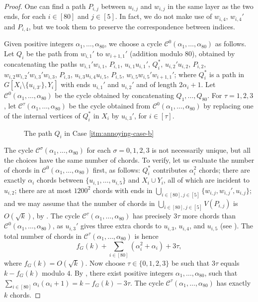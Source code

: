 \documentclass[10pt,a4paper]{amsart}
\theoremstyle{plain}
\theoremstyle{definition}
\newcommand{\C}{\mathcal{C}}
\begin{document}
\begin{proof}
        One can find a path $P_{i, j}$ between $u_{i, j}$ and $w_{i, j}$ in the same layer as the two ends, for each $i \in [80]$ and $j \in [5]$. 
        In fact, we do not make use of $w_{i, 4}$, $w_{i, 4}'$ and $P_{i, 4}$, but we took them to preserve the correspondence between indices.
        
        Given positive integers $\alpha_1, \ldots, \alpha_{80}$, we choose a cycle $\C^0(\alpha_1, \ldots, \alpha_{80})$ as follows. Let $Q_i$ be the path from $w_{i, 1}'$ to $w_{i+1, 1}'$ (addition modulo $80$), obtained by concatenating the paths $w_{i,1}' w_{i,1}$, $P_{i, 1}$, $u_{i, 1} u_{i, 1}'$, $Q_{i}^*$, $u_{i, 2}' u_{i, 2}$, $P_{i, 2}$, $w_{i, 2} w_{i, 2}' w_{i, 3}' w_{i, 3}$, $P_{i, 3}$, $u_{i, 3} u_{i, 4} u_{i, 5}$, $P_{i, 5}$, $w_{i, 5} w_{i, 5}' w_{i+1, 1}'$; where $Q_i^*$ is a path in $G[X_i \setminus \{u_{i, 3'}\}, Y_i]$ with ends $u_{i,1}'$ and $u_{i, 2}'$ and of length $2\alpha_i + 1$. Let $\C^0(\alpha_1, \ldots, \alpha_{80})$ be the cycle obtained by concatenating $Q_1, \ldots, Q_{80}$. For $\tau =1,2,3$, let $\C^{\tau}(\alpha_1, \ldots, \alpha_{80})$ be the cycle obtained from $\C^0(\alpha_1, \ldots, \alpha_{80})$ by replacing one of the internal vertices of $Q_{i}^*$ in $X_i$ by $u_{i, 3}'$, for $i \in [\tau]$. 
        \begin{figure}
            \centering

            \caption{The path $Q_i$ in Case \ref{itm:annoying-case-b}}
            \label{fig:annoying-case-b}
        \end{figure}
        
        The cycle $\C^\sigma(\alpha_1, \ldots, \alpha_{80})$ for each $\sigma=0,1,2,3$ is not necessarily unique, but all the choices have the same number of chords. 
        To verify, let us evaluate the number of chords in $\C^0(\alpha_1, \ldots, \alpha_{80})$ first, as follows: $Q_i^*$ contributes $\alpha_i^2$ chords; there are exactly $\alpha_i$ chords between $\{u_{i,1}, \ldots, u_{i, 5}\}$ and $X_i \cup Y_i$, all of which are incident to $u_{i,2}$; there are at most $1200^2$ chords with ends in $\bigcup_{i \in [80], j \in [5]} \{w_{i, j}, w_{i,j}', u_{i, j}\}$; and we may assume that the number of chords in $\bigcup_{i \in [80], j \in [5]} V(P_{i, j})$ is $O(\sqrt{k})$, by . 
        The cycle $\C^{\tau}(\alpha_1, \ldots, \alpha_{80})$ has precisely $3\tau$ more chords than $\C^0(\alpha_1, \ldots, \alpha_{80})$, as $u_{i,3}'$ gives three extra chords to $u_{i,3}$, $u_{i,4}$, and $u_{i,5}$ (see ).
        The total number of chords in $\C^{\tau}(\alpha_1, \ldots, \alpha_{80})$ is hence
        \begin{equation*}
            f_G(k) + \sum_{i \in [80]}(\alpha_i^2 + \alpha_i) + 3\tau,
        \end{equation*}
        where $f_G(k) = O(\sqrt{k})$. 
        Now choose $\tau \in \{0, 1, 2, 3\}$ be such that $3\tau$ equals $k - f_G(k)$ modulo $4$. By , there exist positive integers $\alpha_1, \ldots, \alpha_{80}$, such that $\sum_{i \in [80]} \alpha_i(\alpha_i + 1) = k - f_G(k) - 3\tau$. The cycle $\C^{\tau}(\alpha_1, \ldots, \alpha_{80})$ has exactly $k$ chords.
    \end{proof}
\end{document}

